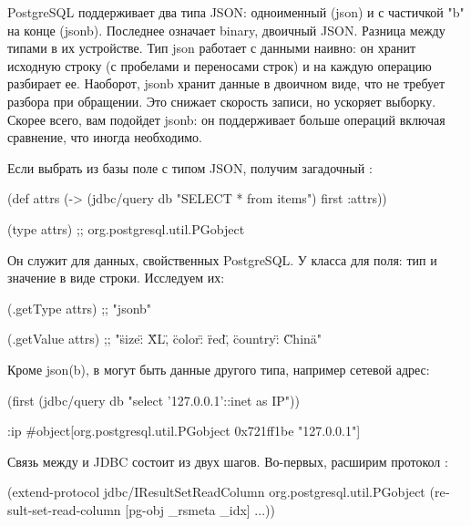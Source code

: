 PostgreSQL поддерживает два типа JSON: одноименный (json) и с частичкой "b" на конце (jsonb). Последнее означает binary, двоичный JSON. Разница между типами в их устройстве. Тип json работает с данными наивно: он хранит исходную строку (с пробелами и переносами строк) и на каждую операцию разбирает ее. Наоборот, jsonb хранит данные в двоичном виде, что не требует разбора при обращении. Это снижает скорость записи, но ускоряет выборку. Скорее всего, вам подойдет jsonb: он поддерживает больше операций включая сравнение, что иногда необходимо.

Если выбрать из базы поле с типом JSON, получим загадочный :

\begin{english}
  \begin{clojure}
(def attrs
  (-> (jdbc/query db "SELECT * from items")
      first
      :attrs))

(type attrs)
;; org.postgresql.util.PGobject
  \end{clojure}
\end{english}

Он служит для данных, свойственных PostgreSQL. У класса для поля: тип и значение в виде строки. Исследуем их:

\begin{english}
  \begin{clojure}
(.getType attrs)
;; "jsonb"

(.getValue attrs)
;; "{\"size\": \"XL\", \"color\": \"red\", \"country\": \"China\"}"
  \end{clojure}
\end{english}

Кроме json(b), в  могут быть данные другого типа, например сетевой адрес:

\begin{english}
  \begin{clojure}
(first (jdbc/query db "select '127.0.0.1'::inet as IP"))

{:ip #object[org.postgresql.util.PGobject 0x721ff1be "127.0.0.1"]}
  \end{clojure}
\end{english}

Связь между  и JDBC состоит из двух шагов. Во-первых, расширим протокол :

\begin{english}
  \begin{clojure}
(extend-protocol jdbc/IResultSetReadColumn
  org.postgresql.util.PGobject
  (result-set-read-column [pg-obj _rsmeta _idx]
    ...))
  \end{clojure}
\end{english}

